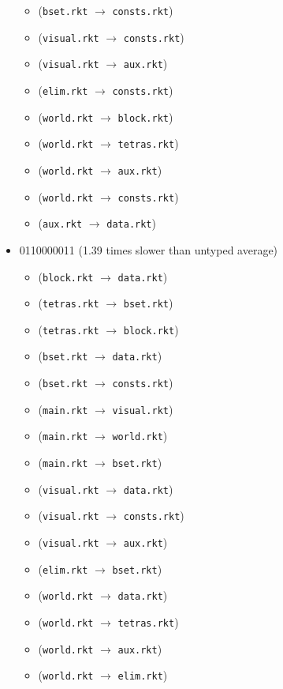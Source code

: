 \documentclass{article}
\newcommand{\mono}[1]{\texttt{#1}}
\begin{document}
\begin{itemize}
\begin{itemize}
  \item (\mono{bset.rkt} $\rightarrow$ \mono{consts.rkt})
  \item (\mono{visual.rkt} $\rightarrow$ \mono{consts.rkt})
  \item (\mono{visual.rkt} $\rightarrow$ \mono{aux.rkt})
  \item (\mono{elim.rkt} $\rightarrow$ \mono{consts.rkt})
  \item (\mono{world.rkt} $\rightarrow$ \mono{block.rkt})
  \item (\mono{world.rkt} $\rightarrow$ \mono{tetras.rkt})
  \item (\mono{world.rkt} $\rightarrow$ \mono{aux.rkt})
  \item (\mono{world.rkt} $\rightarrow$ \mono{consts.rkt})
  \item (\mono{aux.rkt} $\rightarrow$ \mono{data.rkt})
  \end{itemize}
\item 0110000011 (1.39 times slower than untyped average)
  \begin{itemize}
  \item (\mono{block.rkt} $\rightarrow$ \mono{data.rkt})
  \item (\mono{tetras.rkt} $\rightarrow$ \mono{bset.rkt})
  \item (\mono{tetras.rkt} $\rightarrow$ \mono{block.rkt})
  \item (\mono{bset.rkt} $\rightarrow$ \mono{data.rkt})
  \item (\mono{bset.rkt} $\rightarrow$ \mono{consts.rkt})
  \item (\mono{main.rkt} $\rightarrow$ \mono{visual.rkt})
  \item (\mono{main.rkt} $\rightarrow$ \mono{world.rkt})
  \item (\mono{main.rkt} $\rightarrow$ \mono{bset.rkt})
  \item (\mono{visual.rkt} $\rightarrow$ \mono{data.rkt})
  \item (\mono{visual.rkt} $\rightarrow$ \mono{consts.rkt})
  \item (\mono{visual.rkt} $\rightarrow$ \mono{aux.rkt})
  \item (\mono{elim.rkt} $\rightarrow$ \mono{bset.rkt})
  \item (\mono{world.rkt} $\rightarrow$ \mono{data.rkt})
  \item (\mono{world.rkt} $\rightarrow$ \mono{tetras.rkt})
  \item (\mono{world.rkt} $\rightarrow$ \mono{aux.rkt})
  \item (\mono{world.rkt} $\rightarrow$ \mono{elim.rkt})

\end{itemize}
\end{itemize}
\end{document}
